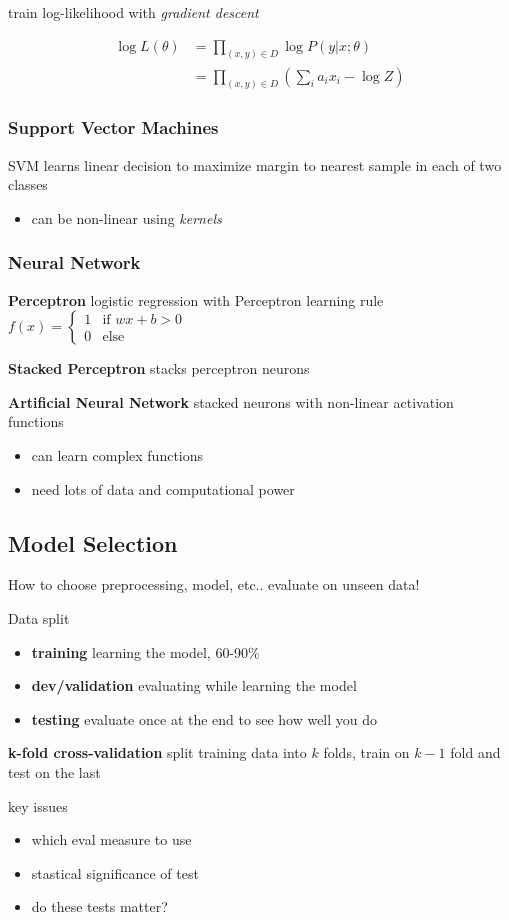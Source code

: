 \documentclass[]{article}
\theoremstyle{definition}
\begin{document}
train log-likelihood with \textit{gradient descent}

\begin{align}
    \log L(\theta) &= \prod_{(x,y) \in D} \log P(y|x;\theta) \\
                   &=  \prod_{(x,y) \in D} (\sum_i a_i x_i - \log Z)
\end{align}

\subsubsection{Support Vector Machines}%
\label{ssub:support_vector_machines}

SVM learns linear decision to maximize margin to nearest sample in each of two classes
\begin{itemize}
    \item can be non-linear using \textit{kernels}
\end{itemize}

\subsubsection{Neural Network}%
\label{ssub:neural_network}

\textbf{Perceptron} logistic regression with Perceptron learning rule
$f(x) = \begin{cases} 1 & \text{if } wx+b > 0 \\ 0 & \text{else} \end{cases}$

\textbf{Stacked Perceptron} stacks perceptron neurons

\textbf{Artificial Neural Network} stacked neurons with non-linear activation functions
\begin{itemize}
    \item can learn complex functions
    \item need lots of data and computational power
\end{itemize}




\subsection{Model Selection}%
\label{sub:model_selection}

How to choose preprocessing, model, etc.. evaluate on unseen data!

Data split
\begin{itemize}
    \item \textbf{training} learning the model, 60-90\%
    \item \textbf{dev/validation} evaluating while learning the model
    \item \textbf{testing} evaluate once at the end to see how well you do
\end{itemize}

\textbf{k-fold cross-validation} split training data into $k$ folds, train on $k-1$ fold and test on the last

key issues
\begin{itemize}
    \item which eval measure to use
    \item stastical significance of test
    \item do these tests matter?
\end{itemize}
\end{document}
